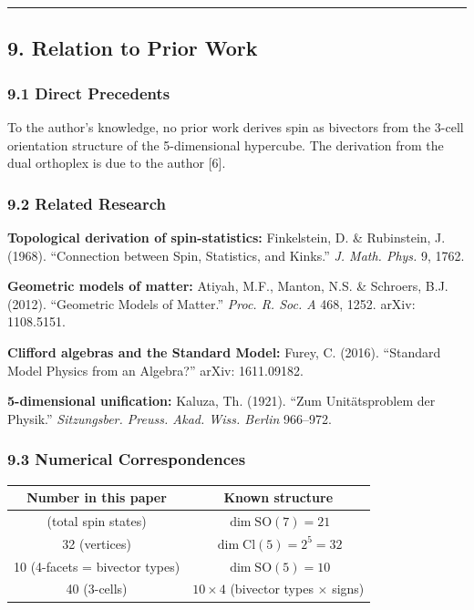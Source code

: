 \documentclass[a4paper,11pt]{article}
\newcounter{none}
\begin{document}
\begin{center}\rule{0.5\linewidth}{0.5pt}\end{center}

\subsection*{9. Relation to Prior Work}

\subsubsection*{9.1 Direct Precedents}

To the author's knowledge, no prior work derives spin as bivectors from the 3-cell orientation structure of the 5-dimensional hypercube. The derivation from the dual orthoplex is due to the author [6].

\subsubsection*{9.2 Related Research}

\textbf{Topological derivation of spin-statistics:} Finkelstein, D. \& Rubinstein, J. (1968). ``Connection between Spin, Statistics, and Kinks.'' \emph{J. Math. Phys.} 9, 1762.

\textbf{Geometric models of matter:} Atiyah, M.F., Manton, N.S. \& Schroers, B.J. (2012). ``Geometric Models of Matter.'' \emph{Proc. R. Soc. A} 468, 1252. arXiv: 1108.5151.

\textbf{Clifford algebras and the Standard Model:} Furey, C. (2016). ``Standard Model Physics from an Algebra?'' arXiv: 1611.09182.

\textbf{5-dimensional unification:} Kaluza, Th. (1921). ``Zum Unit\"atsproblem der Physik.'' \emph{Sitzungsber. Preuss. Akad. Wiss. Berlin} 966--972.

\subsubsection*{9.3 Numerical Correspondences}

{\def\LTcaptype{none}
\begin{longtable}[]{@{}cc@{}}
\toprule
Number in this paper & Known structure \\
\midrule
\endhead
\bottomrule
\endlastfoot
21 (total spin states) & $\dim \mathrm{SO}(7) = 21$ \\
32 (vertices) & $\dim \mathrm{Cl}(5) = 2^5 = 32$ \\
10 (4-facets = bivector types) & $\dim \mathrm{SO}(5) = 10$ \\
40 (3-cells) & $10 \times 4$ (bivector types $\times$ signs) \\
\end{longtable}
}
\end{document}
